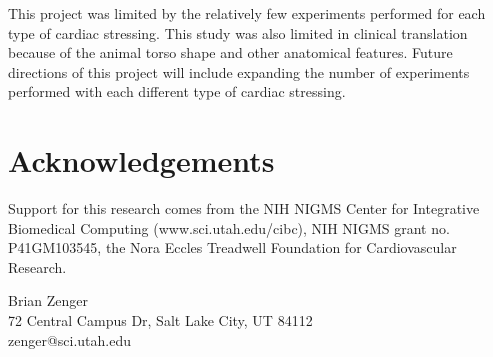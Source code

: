 \documentclass[twocolumn]{cinc}
\begin{document}
This project was limited by the relatively few experiments performed for each type of cardiac stressing. This study was also limited in clinical translation because of the animal torso shape and other anatomical features. Future directions of this project will include expanding the number of experiments performed with each different type of cardiac stressing. 


\balance


\section*{Acknowledgements}  
% 
Support for this research comes from the NIH NIGMS Center for Integrative
Biomedical Computing (www.sci.utah.edu/cibc), NIH NIGMS grant
no. P41GM103545, the Nora Eccles Treadwell Foundation for Cardiovascular Research.






\begin{correspondence}
Brian Zenger\\
72 Central Campus Dr, Salt Lake City, UT 84112\\
zenger@sci.utah.edu
\end{correspondence}

\end{document}
